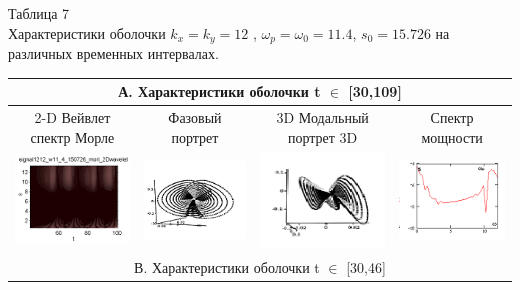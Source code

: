 \documentclass[12pt,letterpaper]{extreport}
\begin{document}
\begin{table}[H]

{\setlength{\arrayrulewidth}{1.25pt}
\begin{flushright}
Таблица 7\\
Характеристики оболочки $k_x=k_y=12$ , $\omega_p= \omega_0 =11.4$, $s_0=15.726$  на различных временных интервалах.

\end{flushright}
\begin{tabular}{|c|c|c|c|}

\hline
\multicolumn{4}{|c|}{А. Характеристики оболочки t $\in$ [30,109]}

\\
\hline
\footnotesize 2-D Вейвлет спектр Морле&\footnotesize Фазовый портрет&\footnotesize 3D	Модальный портрет 3D&\footnotesize Спектр мощности\\
\hline
	\includegraphics[scale=1]{a1} 	
	&	
	\includegraphics[scale=1]{a2} 	
	&	
	\includegraphics[scale=1]{a3} 
	&
	\includegraphics[scale=1]{a4} 
\\
\hline
\multicolumn{4}{|c|}{В. Характеристики оболочки t $\in$ [30,46]}\\


\end{tabular}}
\end{table}
\end{document}
